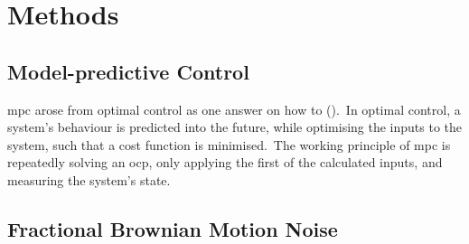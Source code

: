 \section{Methods}

\subsection{Model-predictive Control}
\ac{mpc} arose from optimal control as one answer on how to  (\cite{rawlings2017mpc}).\ 
In optimal control, a system's behaviour is predicted into the future, while optimising the inputs to the system, such that a cost function is minimised.\
The working principle of \ac{mpc} is repeatedly solving an \ac{ocp}, only applying the first of the calculated inputs, and measuring the system's state.\ 



\subsection{Fractional Brownian Motion Noise}